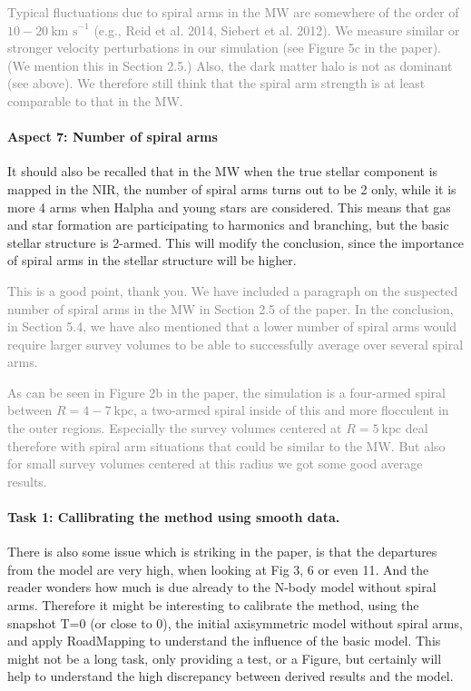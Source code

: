 \documentclass[10pt,a4paper]{article}
\newcommand{\Answer}[1]{\textcolor{Gray}{#1}}
\begin{document}
\Answer{Typical fluctuations due to spiral arms in the MW are somewhere of the order of $10-20~\text{km s}^{-1}$ (e.g., Reid et al. 2014, Siebert et al. 2012). We measure similar or stronger velocity perturbations in our simulation (see Figure 5c in the paper). (We mention this in Section 2.5.) Also, the dark matter halo is not as dominant (see above). We therefore still think that the spiral arm strength is at least comparable to that in the MW.}

\paragraph{Aspect 7: Number of spiral arms} It should also be recalled that in the MW when the true stellar component is mapped
in the NIR, the number of spiral arms turns out to be 2 only, while it is more 4
arms when Halpha and young stars are considered. This means that gas and star
formation are participating to harmonics and branching, but the basic stellar
structure is 2-armed. This will modify the conclusion, since the importance of
spiral arms in the stellar structure will be higher.

\Answer{This is a good point, thank you. We have included a paragraph on the suspected number of spiral arms in the MW in Section 2.5 of the paper. In the conclusion, in Section 5.4, we have also mentioned that a lower number of spiral arms would require larger survey volumes to be able to successfully average over several spiral arms.}

\Answer{As can be seen in Figure 2b in the paper, the simulation is a four-armed spiral between $R=4-7~\text{kpc}$, a two-armed spiral inside of this and more flocculent in the outer regions. Especially the survey volumes centered at $R=5~\text{kpc}$ deal therefore with spiral arm situations that could be similar to the MW. But also for small survey volumes centered at this radius we got some good average results.}

\paragraph{Task 1: Callibrating the method using smooth data.} There is also some issue which is striking in the paper, is that the departures from
the model are very high, when looking at Fig 3, 6 or even 11. And the reader wonders
how much is due already to the N-body model without spiral arms. Therefore it might
be interesting to calibrate the method, using the snapshot T=0 (or close to 0), the
initial axisymmetric model without spiral arms, and apply RoadMapping to understand
the  influence of the basic model. This might not be a long task, only providing a
test, or a Figure, but certainly will help to understand the high discrepancy
between derived results and the model.
\end{document}
